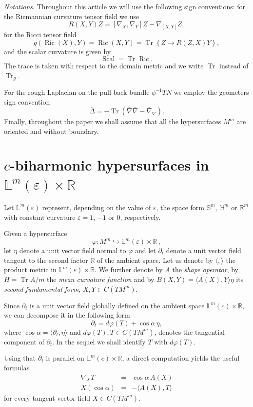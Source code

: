 \documentclass[11pt,leqno]{amsart}
\theoremstyle{plain}
\theoremstyle{definition}
\numberwithin{equation}{section}
\def \R{{\mathbb R}}
\def \s{{\mathbb S}}
\def \h{{\mathbb H}}
\newcommand{\Ric}{\operatorname{Ric}}
\newcommand{\Scal}{\operatorname{Scal}}
\DeclareMathOperator{\trace}{Tr}
\numberwithin{equation}{section}
\begin{document}
{\small {\em Notations}. Throughout this article we will use the following sign conventions: 
for the Riemannian curvature tensor field we use 
$$
R(X,Y)Z=[\nabla_X,\nabla_Y]Z-\nabla_{[X,Y]}Z,
$$ 
for the Ricci tensor field 
$$
g(\Ric(X),Y)=\Ric(X,Y)=\trace \left\{Z\to R(Z,X)Y\right\},
$$
and the scalar curvature is given by
$$
\Scal=\trace\Ric.
$$
The trace is taken with respect to the domain metric and we write $\trace$ instead of $\trace_g$.

For the rough Laplacian on the pull-back bundle $\phi^{-1} TN$ we employ the geometers sign convention
$$
\bar\Delta = -\trace(\bar\nabla\bar\nabla-\bar\nabla_\nabla).
$$
Finally, throughout the paper we shall assume that all the hypersurfaces $M^m$ are oriented and without boundary.

\section{$c$-biharmonic hypersurfaces in ${\mathbb L}^m(\varepsilon)\times \R$} \label{sec-preliminaries}
 
Let ${\mathbb L}^m(\varepsilon)$ represent, depending on the value of $\varepsilon$, the space form $\s^m$, $\h^m$ or $\R^m$ with
constant curvature $\varepsilon=1$, $-1$ or $0$, respectively.
 
Given a hypersurface  
\[
\varphi:M^m\hookrightarrow {\mathbb L}^m(\varepsilon)\times \mathbb R\,,
\]
let $\eta$ denote a unit vector field normal to
$\varphi$ and let $\partial_t$ denote a unit vector field tangent to the second factor $\R$ of the ambient space. Let us denote by $\langle,\rangle$ the product metric in ${\mathbb L}^m(\varepsilon)\times \R$. We further denote by $A$ the {\em shape operator}, by $H=\trace A/m$ the {\em mean curvature function} and by $B(X,Y)=\langle A(X),Y\rangle \eta$ its {\em second fundamental form}, $X,Y\in C(TM^m)$.

Since $\partial_t$ is a unit vector field globally defined on the
ambient space ${\mathbb L}^m(c)\times \mathbb R$, we can decompose it in the
following form
\begin{equation}
\label{eq:dt}
\partial_t=d\varphi(T)+\cos\alpha\,\eta,
\end{equation}
where $\cos\alpha= \langle \partial_t, \eta\rangle$  and  $d\varphi(T), T\in C(TM^m)$, denotes the tangential component of $\partial_t$. In the sequel we shall identify $T$ with $d\varphi(T)$.

Using that $\partial_t$ is parallel on ${\mathbb L}^m(c)\times \mathbb R$, a direct
computation yields the useful formulas 
\begin{eqnarray}
\nabla_XT&=&\cos\alpha \,A(X)\label{eq:nablaXT}\\
X(\cos\alpha)&=&-\langle A(X),T\rangle \label{eq:XTheta}
\end{eqnarray}
for every tangent vector field $X\in C(TM^m)$.


}
\end{document}
